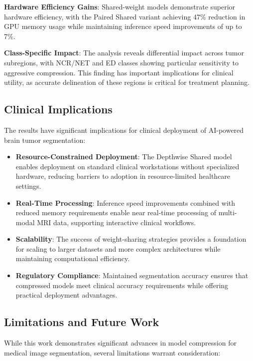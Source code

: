 \documentclass[12pt,a4paper]{article}
\begin{document}
\begin{enumerate}
\textbf{Hardware Efficiency Gains}: Shared-weight models demonstrate superior hardware efficiency, with the Paired Shared variant achieving 47\% reduction in GPU memory usage while maintaining inference speed improvements of up to 7\%.

\textbf{Class-Specific Impact}: The analysis reveals differential impact across tumor subregions, with NCR/NET and ED classes showing particular sensitivity to aggressive compression. This finding has important implications for clinical utility, as accurate delineation of these regions is critical for treatment planning.

\subsection{Clinical Implications}

The results have significant implications for clinical deployment of AI-powered brain tumor segmentation:

\begin{itemize}
\item \textbf{Resource-Constrained Deployment}: The Depthwise Shared model enables deployment on standard clinical workstations without specialized hardware, reducing barriers to adoption in resource-limited healthcare settings.

\item \textbf{Real-Time Processing}: Inference speed improvements combined with reduced memory requirements enable near real-time processing of multi-modal MRI data, supporting interactive clinical workflows.

\item \textbf{Scalability}: The success of weight-sharing strategies provides a foundation for scaling to larger datasets and more complex architectures while maintaining computational efficiency.

\item \textbf{Regulatory Compliance}: Maintained segmentation accuracy ensures that compressed models meet clinical accuracy requirements while offering practical deployment advantages.
\end{itemize}

\subsection{Limitations and Future Work}

While this work demonstrates significant advances in model compression for medical image segmentation, several limitations warrant consideration:


\end{enumerate}
\end{document}
